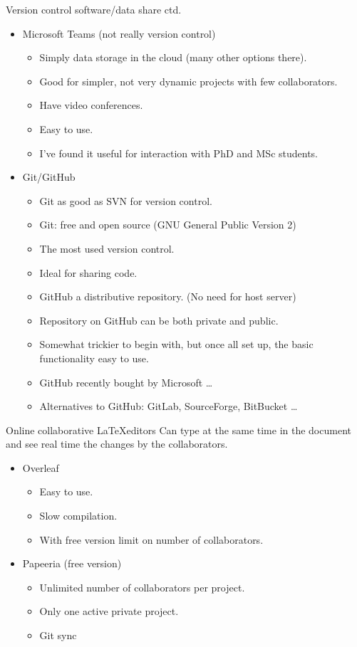 \documentclass{beamer}
\begin{document}
\begin{frame}{Version control software/data share ctd.}
  \begin{itemize}
  \item Microsoft Teams (not really version control)
    \begin{itemize}
    \item Simply data storage in the cloud (many other options there).
    \item Good for simpler, not very dynamic projects with few collaborators.
    \item Have video conferences.
   \item Easy to use.
    \item I've found it useful for interaction with PhD and MSc students.      \pause
    \end{itemize}
\item Git/GitHub
  \begin{itemize}
  \item Git as good as SVN for version control.
  \item Git: free and open source (GNU General Public Version 2)
   \item The most used version control.   
   \item Ideal for sharing code.
   \item GitHub a distributive repository. (No need for host server)
    \item Repository on GitHub can be both private and public.
    \item Somewhat trickier to begin with, but once all set up, the basic functionality easy to use.
    \item GitHub recently bought by Microsoft \dots
    \item Alternatives to GitHub: GitLab, SourceForge, BitBucket \dots
  \end{itemize}
  \end{itemize}
\end{frame}

\begin{frame}{Online collaborative \LaTeX editors}
 Can type at the same time in the document and see real time the changes by the collaborators.

  \begin{itemize}
  \item Overleaf
    \begin{itemize}
    \item Easy to use.
     \item Slow compilation.
    \item With free version limit on number of collaborators.
    \end{itemize}
\item Papeeria (free version)
  \begin{itemize}
  \item Unlimited number of collaborators per project.
  \item Only one active private project.
\item Git sync
    \end{itemize}
  \end{itemize}
\end{frame}
\end{document}
